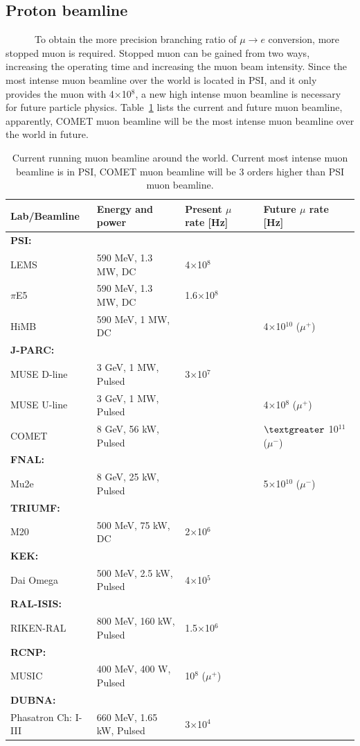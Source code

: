 \subsection{Proton beamline}
~~~~~~To obtain the more precision branching ratio of $\mu \rightarrow e$ conversion, more stopped muon is required.
Stopped muon can be gained from two ways, increasing the operating time and increasing the muon beam intensity.
Since the most intense muon beamline over the world is located in PSI, and it only provides the muon with 4$\times$10$^8$, a new high intense muon beamline is necessary for future particle physics.
Table~\ref{protonbeam} lists the current and future muon beamline, apparently, COMET muon beamline will be the most intense muon beamline over the world in future.
\begin{table}[H]
 \centering
 \begin{tabular}{llll} \hline \hline
 Lab/Beamline & Energy and power & Present $\mu$ rate [Hz] & Future $\mu$ rate [Hz] \\ \hline
 \textbf{PSI:} & & & \\
 LEMS & 590 MeV, 1.3 MW, DC & 4$\times$10$^8$ & \\
 $\pi$E5 & 590 MeV, 1.3 MW, DC & 1.6$\times$10$^8$ & \\
 HiMB & 590 MeV, 1 MW, DC & & 4$\times$10$^{10}$ ($\mu^+$) \\ \hline
 \textbf{J-PARC:} & & & \\
 MUSE D-line & 3 GeV, 1 MW, Pulsed & 3$\times$10$^7$ & \\
 MUSE U-line & 3 GeV, 1 MW, Pulsed & & 4$\times$10$^8$ ($\mu^+$) \\
 COMET & 8 GeV, 56 kW, Pulsed & & $\textgreater$ 10$^{11}$ ($\mu^-$) \\ \hline
 \textbf{FNAL:} & & & \\
 Mu2e & 8 GeV, 25 kW, Pulsed & & 5$\times$10$^{10}$ ($\mu^-$) \\ \hline
 \textbf{TRIUMF:} & & & \\
 M20 & 500 MeV, 75 kW, DC & 2$\times$10$^6$ & \\ \hline
 \textbf{KEK:} & & & \\
 Dai Omega & 500 MeV, 2.5 kW, Pulsed & 4$\times$10$^5$ & \\ \hline
 \textbf{RAL-ISIS:} & & & \\
 RIKEN-RAL & 800 MeV, 160 kW, Pulsed & 1.5$\times$10$^6$ & \\ \hline
 \textbf{RCNP:} & & & \\
 MUSIC & 400 MeV, 400 W, Pulsed & 10$^8$ ($\mu^+$) & \\ \hline
 \textbf{DUBNA:} & & & \\
 Phasatron Ch: I-III & 660 MeV, 1.65 kW, Pulsed & 3$\times$10$^4$ & \\ \hline \hline
 \end{tabular}
 \caption{Current running muon beamline around the world. Current most intense muon beamline is in PSI, COMET muon beamline will be 3 orders higher than PSI muon beamline.}
 \label{protonbeam}
\end{table}

